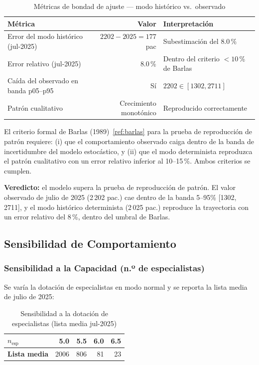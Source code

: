 \documentclass[12pt,a4paper]{article}
\begin{document}
\begin{table}[H]
  \centering
  \caption{Métricas de bondad de ajuste — modo histórico vs.\ observado}
  \label{tab:metricas}
  \begin{tabular}{@{}lrl@{}}
    \toprule
    \rowcolor{azulDS!15}
    \textbf{Métrica}                      & \textbf{Valor}          & \textbf{Interpretación}                  \\
    \midrule
    Error del modo histórico (jul-2025)   & $2202 - 2025 = 177$ pac & Subestimación del $8.0$\,\%              \\
    Error relativo (jul-2025)             & $8.0$\,\%               & Dentro del criterio $< 10$\,\% de Barlas \\
    Caída del observado en banda p05--p95 & Sí                      & $2202 \in [1302, 2711]$                  \\
    Patrón cualitativo                    & Crecimiento monotónico  & Reproducido correctamente                \\
    \bottomrule
  \end{tabular}
\end{table}

El criterio formal de Barlas (1989)~\ref{ref:barlas} para la prueba de reproducción de patrón requiere: (i) que el comportamiento observado caiga dentro de la banda de incertidumbre del modelo estocástico, y (ii) que el modo determinista reproduzca el patrón cualitativo con un error relativo inferior al 10--15\,\%. Ambos criterios se cumplen.

\textbf{Veredicto:} el modelo supera la prueba de reproducción de patrón. El valor observado de julio de 2025 (2\,202 pac.) cae dentro de la banda 5--95\% [1302, 2711], y el modo histórico determinista (2\,025 pac.) reproduce la trayectoria con un error relativo del 8\,\%, dentro del umbral de Barlas.

\subsection{Sensibilidad de Comportamiento}
\subsubsection*{Sensibilidad a la Capacidad (n.º de especialistas)}
Se varía la dotación de especialistas en modo normal y se reporta la lista media de julio de 2025:

\begin{table}[H]
  \centering
  \caption{Sensibilidad a la dotación de especialistas (lista media jul-2025)}
  \label{tab:sens_cap}
  \begin{tabular}{@{}lrrrr@{}}
    \toprule
    \rowcolor{azulDS!15}
    \textbf{$n_{\text{esp}}$} & 5.0  & 5.5 & 6.0 & 6.5 \\
    \midrule
    \textbf{Lista media}      & 2006 & 806 & 81  & 23  \\
    \bottomrule
  \end{tabular}
\end{table}
\end{document}
